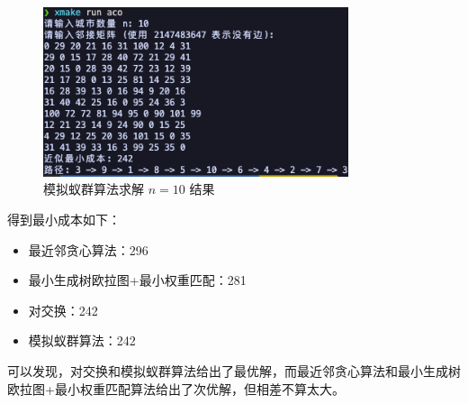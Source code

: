 \begin{figure}[htbp]
    \centering
    \includegraphics[width=0.8\textwidth]{images/aco_10.png}
    \caption{模拟蚁群算法求解 $n=10$ 结果}
    \label{fig:ant}
\end{figure}

得到最小成本如下：\begin{itemize}
    \item 最近邻贪心算法：296
    \item 最小生成树欧拉图+最小权重匹配：281
    \item 对交换：242
    \item 模拟蚁群算法：242
\end{itemize}

可以发现，对交换和模拟蚁群算法给出了最优解，而最近邻贪心算法和最小生成树欧拉图+最小权重匹配算法给出了次优解，但相差不算太大。

